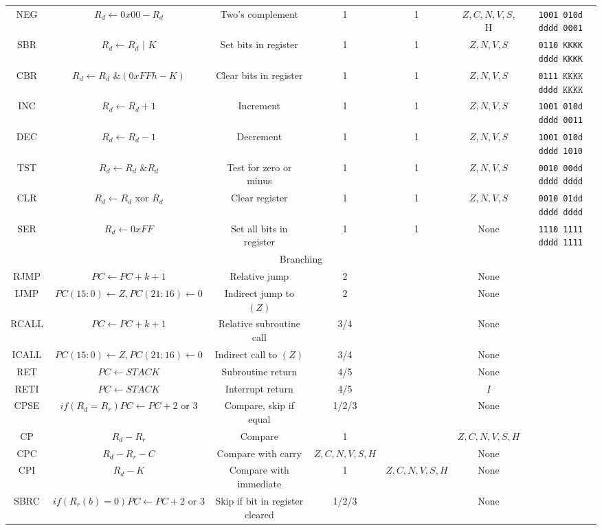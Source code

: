 \documentclass[11pt]{article}
\begin{document}
\begin{center}
\begin{longtable}{|c|c|c|c|c|c|c|}
NEG & $R_d \leftarrow 0x00 - R_d$ & Two's complement & 1 & 1 & $Z, C, N, V, S$, H & \texttt{1001 010d dddd 0001}\\
SBR & $R_d \leftarrow R_d \text{ | } K$ & Set bits in register & 1 & 1 & $Z, N, V, S$ & \texttt{0110 KKKK dddd KKKK}\\
CBR & $R_d \leftarrow R_d \text{ \& } (0xFFh - K)$ & Clear bits in register & 1 & 1 & $Z, N, V, S$ & \texttt{0111 }$\overline{\texttt{KKKK}}$\texttt{ dddd }$\mathtt{\overline{KKKK}}$\\ %
INC & $R_d \leftarrow R_d + 1$ & Increment & 1 & 1 & $Z, N, V, S$ & \texttt{1001 010d dddd 0011}\\
DEC & $R_d \leftarrow R_d - 1$ & Decrement & 1 & 1 & $Z, N, V, S$ & \texttt{1001 010d dddd 1010}\\
TST & $R_d \leftarrow R_d \text{ \& } R_d$ & Test for zero or minus & 1 & 1 & $Z, N, V, S$ & \texttt{0010 00dd dddd dddd}\\
CLR & $R_d \leftarrow R_d \text{ xor } R_d$ & Clear register & 1 & 1 & $Z, N, V, S$ & \texttt{0010 01dd dddd dddd}\\
SER & $R_d \leftarrow 0xFF$ & Set all bits in register & 1 & 1 & None & \texttt{1110 1111 dddd 1111}\\
\hline\hline
\multicolumn{7}{|c|}{Branching} \\
\hline
RJMP & $PC \leftarrow PC + k + 1$ & Relative jump & 2 &  & None & \\
IJMP & $PC(15:0) \leftarrow Z, PC(21:16) \leftarrow 0$ & Indirect jump to $(Z)$ & 2 &  & None & \\
RCALL & $PC \leftarrow PC + k + 1$ & Relative subroutine call & 3/4 &  & None & \\
ICALL & $PC(15:0) \leftarrow Z, PC(21:16) \leftarrow 0$ & Indirect call to $(Z)$ & 3/4 &  & None & \\
RET & $PC \leftarrow STACK$ & Subroutine return & 4/5 &  & None & \\
RETI & $PC \leftarrow STACK$ & Interrupt return & 4/5 &  & $I$ & \\
CPSE & $if(R_d = R_r) PC \leftarrow PC + 2 \text{ or } 3$ & Compare, skip if equal & 1/2/3 &  & None & \\
CP & $R_d - R_r$ & Compare & 1 &  & $Z, C, N, V, S, H$ & \\
CPC & $ R_d - R_r - C$ & Compare with carry & $Z, C, N, V, S, H$ &  & None & \\
CPI & $R_d - K$ & Compare with immediate & 1 & $Z, C, N, V, S, H$ & None & \\
SBRC & $if(R_r(b) = 0) PC \leftarrow PC + 2 \text{ or } 3$ & Skip if bit in register cleared & 1/2/3 &  & None & \\

\end{longtable}
\end{center}
\end{document}
